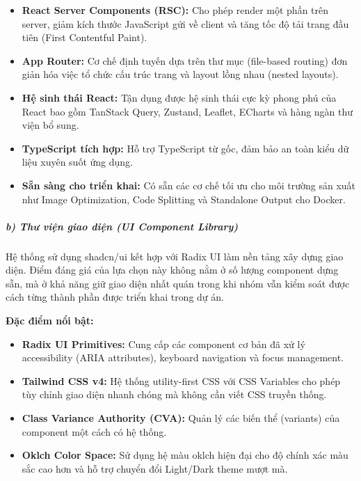 \documentclass[a4paper]{extarticle}
\providecommand{\tightlist}{%
  \setlength{\itemsep}{0pt}\setlength{\parskip}{0pt}}
\begin{document}
\begin{itemize}
\tightlist
\item
  \textbf{React Server Components (RSC):} Cho phép render một phần trên
  server, giảm kích thước JavaScript gửi về client và tăng tốc độ tải
  trang đầu tiên (First Contentful Paint).
\item
  \textbf{App Router:} Cơ chế định tuyến dựa trên thư mục (file-based
  routing) đơn giản hóa việc tổ chức cấu trúc trang và layout lồng nhau
  (nested layouts).
\item
  \textbf{Hệ sinh thái React:} Tận dụng được hệ sinh thái cực kỳ phong
  phú của React bao gồm TanStack Query, Zustand, Leaflet, ECharts và
  hàng ngàn thư viện bổ sung.
\item
  \textbf{TypeScript tích hợp:} Hỗ trợ TypeScript từ gốc, đảm bảo an
  toàn kiểu dữ liệu xuyên suốt ứng dụng.
\item
  \textbf{Sẵn sàng cho triển khai:} Có sẵn các cơ chế tối ưu cho môi
  trường sản xuất như Image Optimization, Code Splitting và Standalone
  Output cho Docker.
\end{itemize}

\subparagraph{b) Thư viện giao diện (UI Component
Library)}\label{b-thux1b0-viux1ec7n-giao-diux1ec7n-ui-component-library}

Hệ thống sử dụng shadcn/ui kết hợp với Radix UI làm nền tảng xây dựng
giao diện. Điểm đáng giá của lựa chọn này không nằm ở số lượng component
dựng sẵn, mà ở khả năng giữ giao diện nhất quán trong khi nhóm vẫn kiểm
soát được cách từng thành phần được triển khai trong dự án.

\textbf{Đặc điểm nổi bật:}

\begin{itemize}
\tightlist
\item
  \textbf{Radix UI Primitives:} Cung cấp các component cơ bản đã xử lý
  accessibility (ARIA attributes), keyboard navigation và focus
  management.
\item
  \textbf{Tailwind CSS v4:} Hệ thống utility-first CSS với CSS Variables
  cho phép tùy chỉnh giao diện nhanh chóng mà không cần viết CSS truyền
  thống.
\item
  \textbf{Class Variance Authority (CVA):} Quản lý các biến thể
  (variants) của component một cách có hệ thống.
\item
  \textbf{Oklch Color Space:} Sử dụng hệ màu oklch hiện đại cho độ chính
  xác màu sắc cao hơn và hỗ trợ chuyển đổi Light/Dark theme mượt mà.
\end{itemize}
\end{document}
